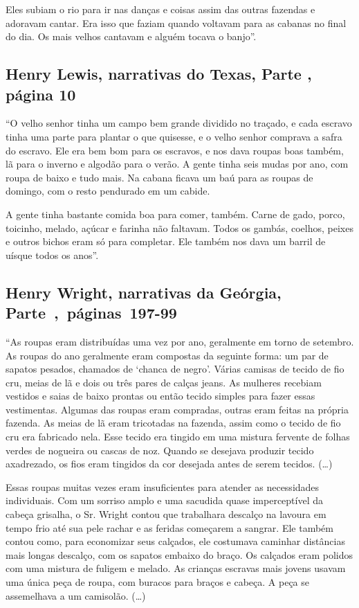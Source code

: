 Eles subiam o rio para ir nas danças e coisas assim das outras fazendas
e adoravam cantar. Era isso que faziam quando voltavam para as cabanas
no final do dia. Os mais velhos cantavam e alguém tocava o banjo''.

\subsection{Henry Lewis, narrativas do Texas, Parte , página 10}
\label{ref176}

``O velho senhor tinha um campo bem grande dividido no traçado, e cada
escravo tinha uma parte para plantar o que quisesse, e o velho senhor
comprava a safra do escravo. Ele era bem bom para os escravos, e nos
dava roupas boas também, lã para o inverno e algodão para o verão. A
gente tinha seis mudas por ano, com roupa de baixo e tudo mais. Na
cabana ficava um baú para as roupas de domingo, com o resto pendurado em
um cabide.

A gente tinha bastante comida boa para comer, também. Carne de gado,
porco, toicinho, melado, açúcar e farinha não faltavam. Todos os gambás,
coelhos, peixes e outros bichos eram só para completar. Ele também nos
dava um barril de uísque todos os anos''.

\subsection{Henry Wright, narrativas da Geórgia, Parte~,~páginas~197-99}
\label{ref317}

``As roupas eram distribuídas uma vez por ano, geralmente em torno de
setembro. As roupas do ano geralmente eram compostas da seguinte forma:
um par de sapatos pesados, chamados de `chanca de negro'. Várias camisas
de tecido de fio cru, meias de lã e dois ou três pares de calças jeans.
As mulheres recebiam vestidos e saias de baixo prontas ou então tecido
simples para fazer essas vestimentas. Algumas das roupas eram compradas,
outras eram feitas na própria fazenda. As meias de lã eram tricotadas na
fazenda, assim como o tecido de fio cru era fabricado nela. Esse tecido
era tingido em uma mistura fervente de folhas verdes de nogueira ou
cascas de noz. Quando se desejava produzir tecido axadrezado, os fios
eram tingidos da cor desejada antes de serem tecidos. (\ldots{})

Essas roupas muitas vezes eram insuficientes para atender as
necessidades individuais. Com um sorriso amplo e uma sacudida quase
imperceptível da cabeça grisalha, o Sr. Wright contou que trabalhara
descalço na lavoura em tempo frio até sua pele rachar e as feridas
começarem a sangrar. Ele também contou como, para economizar seus
calçados, ele costumava caminhar distâncias mais longas descalço, com os
sapatos embaixo do braço. Os calçados eram polidos com uma mistura de
fuligem e melado. As crianças escravas mais jovens usavam uma única peça
de roupa, com buracos para braços e cabeça. A peça se assemelhava a um
camisolão. (\ldots{})

